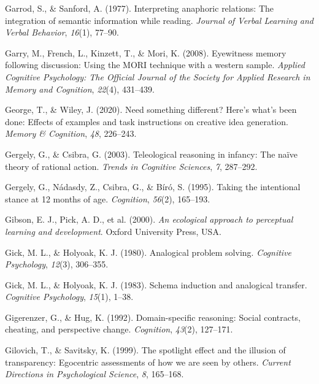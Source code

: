 \documentclass[
]{krantz}
\newlength{\cslhangindent}
\newenvironment{CSLReferences}[2] %
 {\begin{list}{}{%
  \setlength{\itemindent}{0pt}
  \setlength{\leftmargin}{0pt}
  \setlength{\parsep}{0pt}
  \ifodd #1
   \setlength{\leftmargin}{\cslhangindent}
   \setlength{\itemindent}{-1\cslhangindent}
  \fi
  \setlength{\itemsep}{#2\baselineskip}}}
 {\end{list}}
\begin{document}
\begin{CSLReferences}{1}{0}
Garrod, S., \& Sanford, A. (1977). Interpreting anaphoric relations: The integration of semantic information while reading. \emph{Journal of Verbal Learning and Verbal Behavior}, \emph{16}(1), 77--90.

Garry, M., French, L., Kinzett, T., \& Mori, K. (2008). Eyewitness memory following discussion: Using the MORI technique with a western sample. \emph{Applied Cognitive Psychology: The Official Journal of the Society for Applied Research in Memory and Cognition}, \emph{22}(4), 431--439.

George, T., \& Wiley, J. (2020). Need something different? Here's what's been done: Effects of examples and task instructions on creative idea generation. \emph{Memory \& Cognition}, \emph{48}, 226--243.

Gergely, G., \& Csibra, G. (2003). Teleological reasoning in infancy: The naïve theory of rational action. \emph{Trends in Cognitive Sciences}, \emph{7}, 287--292.

Gergely, G., Nádasdy, Z., Csibra, G., \& Bíró, S. (1995). Taking the intentional stance at 12 months of age. \emph{Cognition}, \emph{56}(2), 165--193.

Gibson, E. J., Pick, A. D., et al. (2000). \emph{An ecological approach to perceptual learning and development}. Oxford University Press, USA.

Gick, M. L., \& Holyoak, K. J. (1980). Analogical problem solving. \emph{Cognitive Psychology}, \emph{12}(3), 306--355.

Gick, M. L., \& Holyoak, K. J. (1983). Schema induction and analogical transfer. \emph{Cognitive Psychology}, \emph{15}(1), 1--38.

Gigerenzer, G., \& Hug, K. (1992). Domain-specific reasoning: Social contracts, cheating, and perspective change. \emph{Cognition}, \emph{43}(2), 127--171.

Gilovich, T., \& Savitsky, K. (1999). The spotlight effect and the illusion of transparency: Egocentric assessments of how we are seen by others. \emph{Current Directions in Psychological Science}, \emph{8}, 165--168.


\end{CSLReferences}
\end{document}

